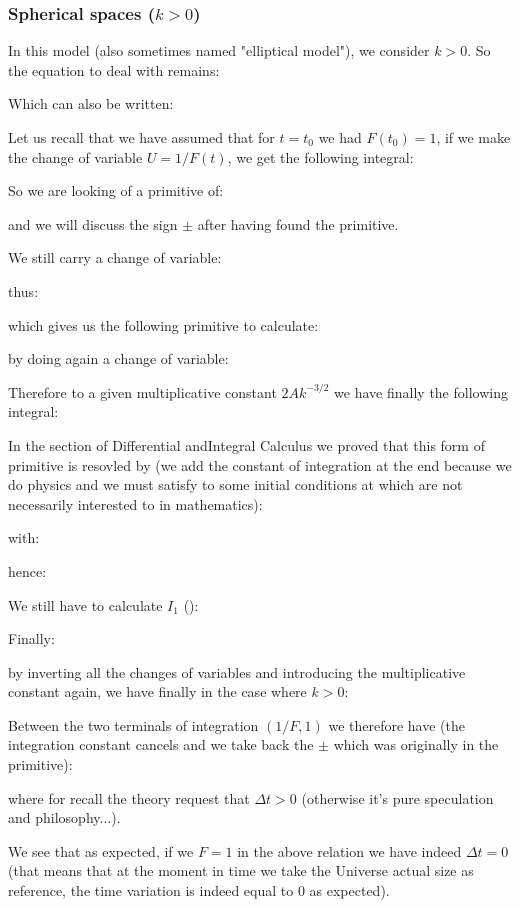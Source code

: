 	\subsubsection{Spherical spaces ($k>0$)}
	In this model (also sometimes named "elliptical model"), we consider $k>0$. So the equation to deal with remains:
	
	Which can also be written:
	
	Let us recall that we have assumed that for $t=t_0$ we had $F(t_0)=1$, if we make the change of variable $U=1/F(t)$, we get the following integral:
	
	So we are looking of a primitive of:
	
	and we will discuss the sign $\pm$ after having found the primitive.

	We still carry a change of variable:
	
	thus:
	
 	which gives us the following primitive to calculate:
	
	by doing again a change of variable:
	
	Therefore to a given multiplicative constant $2Ak^{-3/2}$ we have finally the following integral:
	
	In the section of Differential andIntegral Calculus we proved that this form of primitive is resovled by (we add the constant of integration at the end because we do physics and we must satisfy to some initial conditions at which are not necessarily interested to in mathematics):
	
	with:
	
	hence:
	
	We still have to calculate $I_1$ ():
	
	Finally:
	
	by inverting all the changes of variables and introducing the multiplicative constant again, we have finally in the case where $k>0$:
	
	Between the two terminals of integration $(1/F,1)$ we therefore have (the integration constant cancels and we take back the $\pm$ which was originally in the primitive):
	
	where for recall the theory request that $\Delta t>0$ (otherwise it's pure speculation and philosophy...).
	
	We see that as expected, if we $F=1$ in the above relation we have indeed $\Delta t=0$ (that means that at the moment in time we take the Universe actual size as reference, the time variation is indeed equal to $0$ as expected).
	
